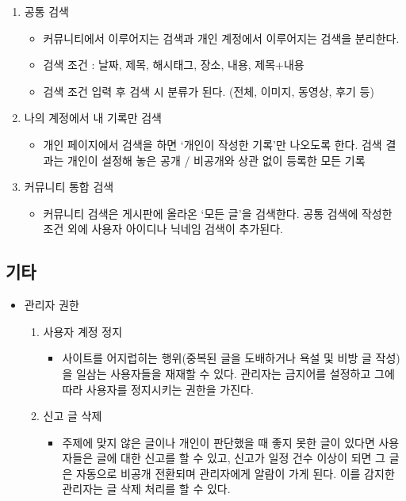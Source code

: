 \begin{enumerate}
    \item 공통 검색
        \begin{itemize}
            \item[] 커뮤니티에서 이루어지는 검색과 개인 계정에서 이루어지는 검색을 분리한다.
            \item[] 검색 조건 : 날짜, 제목, 해시태그, 장소, 내용, 제목+내용
            \item[] 검색 조건 입력 후 검색 시 분류가 된다. (전체, 이미지, 동영상, 후기 등)
        \end{itemize}
    \item 나의 계정에서 내 기록만 검색
        \begin{itemize}
            \item[] 개인 페이지에서 검색을 하면 ‘개인이 작성한 기록’만 나오도록 한다. 검색 결과는 개인이 설정해 놓은 공개 / 비공개와 상관 없이 등록한 모든 기록
        \end{itemize}
    \item 커뮤니티 통합 검색
        \begin{itemize}
            \item[] 커뮤니티 검색은 게시판에 올라온 ‘모든 글’을 검색한다. 공통 검색에 작성한 조건 외에 사용자 아이디나 닉네임 검색이 추가된다.
        \end{itemize}
\end{enumerate}


\subsection{기타}

\begin{itemize}
    \item 관리자 권한
        \begin{enumerate}
            \item 사용자 계정 정지
                \begin{itemize}
                    \item[] 사이트를 어지럽히는 행위(중복된 글을 도배하거나 욕설 및 비방 글 작성)을 일삼는 사용자들을 재재할 수 있다. 관리자는 금지어를 설정하고 그에 따라 사용자를 정지시키는 권한을 가진다.
                \end{itemize}
            \item 신고 글 삭제
                \begin{itemize}
                    \item[] 주제에 맞지 않은 글이나 개인이 판단했을 때 좋지 못한 글이 있다면 사용자들은 글에 대한 신고를 할 수 있고, 신고가 일정 건수 이상이 되면 그 글은 자동으로 비공개 전환되며 관리자에게 알람이 가게 된다. 이를 감지한 관리자는 글 삭제 처리를 할 수 있다.
                \end{itemize}
        \end{enumerate}
\end{itemize}
\par\
\newpage


